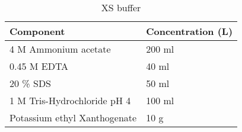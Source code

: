 \documentclass[11pt]{article}
\begin{document}
\begin{table}
\caption{XS buffer}
\begin{tabular}{  p{6.9cm} | p{6.9cm}  }
\hline
Component & Concentration (L) \\
\hline
 4 M Ammonium acetate & 200 ml  \\
  0.45 M EDTA  & 40 ml \\
    20 \% SDS  & 50 ml \\
    1 M Tris-Hydrochloride pH 4    & 100 ml  \\
        Potassium ethyl Xanthogenate  & 10 g  \\
  \hline
\end{tabular}
\end{table}
\end{document}
